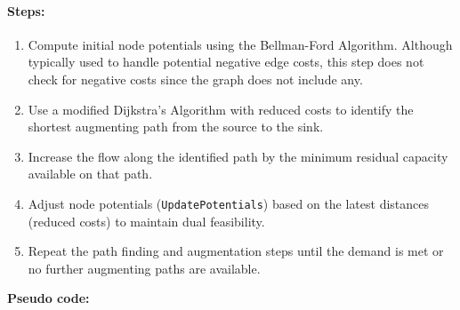 \documentclass{article}
\begin{document}
\paragraph{Steps:}
\begin{enumerate}
    \item Compute initial node potentials using the Bellman-Ford Algorithm. Although typically used to handle potential negative edge costs, this step does not check for negative costs since the graph does not include any.
    \item Use a modified Dijkstra's Algorithm with reduced costs to identify the shortest augmenting path from the source to the sink.
    \item Increase the flow along the identified path by the minimum residual capacity available on that path.
    \item Adjust node potentials (\texttt{UpdatePotentials}) based on the latest distances (reduced costs) to maintain dual feasibility.
    \item Repeat the path finding and augmentation steps until the demand is met or no further augmenting paths are available.
\end{enumerate}

\textbf{Pseudo code:}
\end{document}
